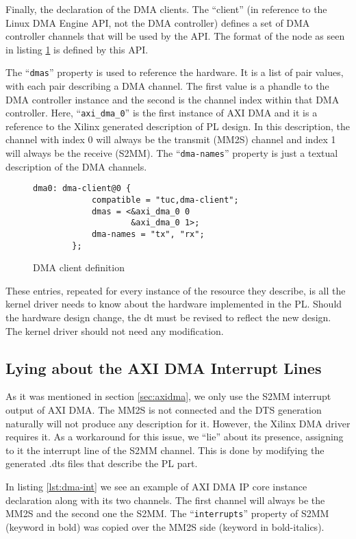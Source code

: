 Finally, the declaration of the DMA clients. 
The ``client'' (in reference to the Linux DMA Engine API, not the DMA controller) defines
a set of DMA controller channels that will be used by the API. 
The format of the node as seen in listing \ref{list:dmaclient} is defined by this API. 

The ``\texttt{dmas}'' property is used to reference the hardware.
It is a list of pair values, with each pair describing a DMA channel.
The first value is a phandle to the DMA controller instance 
and the second is the channel index within that DMA controller.
Here, ``\texttt{axi\_dma\_0}'' is the first instance of AXI DMA and it is a reference
to the Xilinx generated description of PL design. In this description, the channel with index 0
will always be the transmit (MM2S) channel and index 1 will always be the receive (S2MM).
The ``\texttt{dma-names}'' property is just a textual description of the DMA channels.

\begin{figure}[ht!]
\centering
\begin{lstlisting}[style=basic]
		dma0: dma-client@0 {
			compatible = "tuc,dma-client";
			dmas = <&axi_dma_0 0
					&axi_dma_0 1>;
			dma-names = "tx", "rx";
		};
\end{lstlisting}
\caption{DMA client definition}
\label{list:dmaclient}
\end{figure}

These entries, repeated for every instance of the resource they describe, is all the kernel driver
needs to know about the hardware implemented in the PL. 
Should the hardware design change, the \gls{dt} must be revised to reflect the new design.
The kernel driver should not need any modification.

\subsection{Lying about the AXI DMA Interrupt Lines}

As it was mentioned in section \ref{sec:axidma}, we only use the S2MM interrupt output of AXI DMA.
The MM2S is not connected and the DTS generation naturally will not produce any description for it.
However, the Xilinx DMA driver requires it. As a workaround for this issue, we ``lie'' about its presence,
assigning to it the interrupt line of the S2MM channel. This is done by modifying the generated .dts files
that describe the PL part.

In listing \ref{lst:dma-int} we see an example of AXI DMA IP core 
instance declaration along with its two channels.
The first channel will always be the MM2S and the second one the S2MM.
The ``\texttt{interrupts}'' property of S2MM (keyword in bold) was copied over
the MM2S side (keyword in bold-italics).

